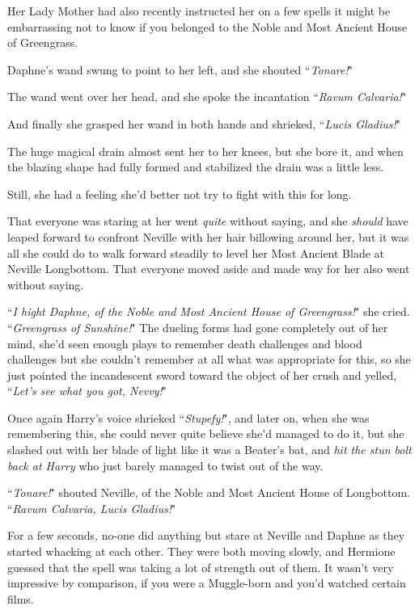 Her Lady Mother had also recently instructed her on a few spells it might be embarrassing not to know if you belonged to the Noble and Most Ancient House of Greengrass.

Daphne's wand swung to point to her left, and she shouted ``\emph{Tonare!}"

The wand went over her head, and she spoke the incantation ``\emph{Ravum Calvaria!}"

And finally she grasped her wand in both hands and shrieked, ``\emph{Lucis Gladius!}"

The huge magical drain almost sent her to her knees, but she bore it, and when the blazing shape had fully formed and stabilized the drain was a little less.

Still, she had a feeling she'd better not try to fight with this for long.

That everyone was staring at her went \emph{quite} without saying, and she \emph{should} have leaped forward to confront Neville with her hair billowing around her, but it was all she could do to walk forward steadily to level her Most Ancient Blade at Neville Longbottom. That everyone moved aside and made way for her also went without saying.

``\emph{I hight Daphne, of the Noble and Most Ancient House of Greengrass!}" she cried. ``\emph{Greengrass of Sunshine!}" The dueling forms had gone completely out of her mind, she'd seen enough plays to remember death challenges and blood challenges but she couldn't remember at all what was appropriate for this, so she just pointed the incandescent sword toward the object of her crush and yelled, ``\emph{Let's see what you got, Nevvy!}"

Once again Harry's voice shrieked ``\emph{Stupefy!}", and later on, when she was remembering this, she could never quite believe she'd managed to do it, but she slashed out with her blade of light like it was a Beater's bat, and \emph{hit the stun bolt back at Harry} who just barely managed to twist out of the way.

``\emph{Tonare!}" shouted Neville, of the Noble and Most Ancient House of Longbottom. ``\emph{Ravum Calvaria, Lucis Gladius!}"

\later

For a few seconds, no-one did anything but stare at Neville and Daphne as they started whacking at each other. They were both moving slowly, and Hermione guessed that the spell was taking a lot of strength out of them. It wasn't very impressive by comparison, if you were a Muggle-born and you'd watched certain films.

